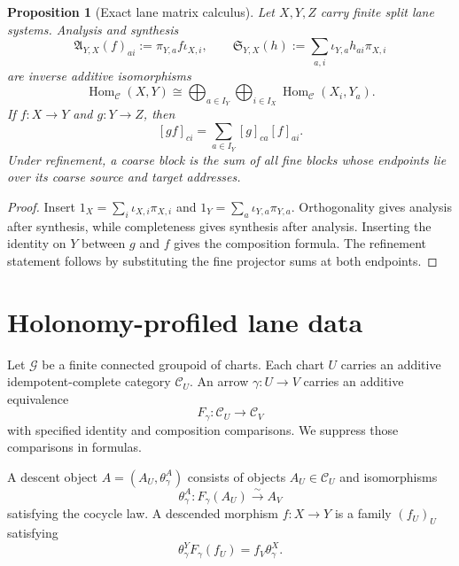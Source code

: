 \documentclass[11pt]{article}
\newtheorem{proposition}[theorem]{Proposition}
\newcommand{\HomC}{\operatorname{Hom}}
\newcommand{\Analysis}{\mathfrak A}
\newcommand{\Synthesis}{\mathfrak S}
\begin{document}
\begin{proposition}[Exact lane matrix calculus]
\label{prop:finite-matrix-calculus}
Let \(X,Y,Z\) carry finite split lane systems.  Analysis and synthesis
\[
 \Analysis_{Y,X}(f)_{ai}:=\pi_{Y,a}f\iota_{X,i},
 \qquad
 \Synthesis_{Y,X}(h):=\sum_{a,i}\iota_{Y,a}h_{ai}\pi_{X,i}
\]
are inverse additive isomorphisms
\[
 \HomC_{\mathcal C}(X,Y)
 \cong
 \bigoplus_{a\in I_Y}\bigoplus_{i\in I_X}
 \HomC_{\mathcal C}(X_i,Y_a).
\]
If \(f:X\to Y\) and \(g:Y\to Z\), then
\[
 [gf]_{ci}=\sum_{a\in I_Y}[g]_{ca}[f]_{ai}.
\]
Under refinement, a coarse block is the sum of all fine blocks whose endpoints lie over its coarse source and target addresses.
\end{proposition}

\begin{proof}
Insert \(1_X=\sum_i\iota_{X,i}\pi_{X,i}\) and
\(1_Y=\sum_a\iota_{Y,a}\pi_{Y,a}\).  Orthogonality gives analysis after synthesis, while completeness gives synthesis after analysis.  Inserting the identity on \(Y\) between \(g\) and \(f\) gives the composition formula.  The refinement statement follows by substituting the fine projector sums at both endpoints.
\end{proof}

\section{Holonomy-profiled lane data}

Let \(\mathscr G\) be a finite connected groupoid of charts.  Each chart \(U\) carries an additive idempotent-complete category \(\mathcal C_U\).  An arrow \(\gamma:U\to V\) carries an additive equivalence
\[
 F_\gamma:\mathcal C_U\longrightarrow\mathcal C_V
\]
with specified identity and composition comparisons.  We suppress those comparisons in formulas.

A descent object \(A=(A_U,\theta^A_\gamma)\) consists of objects \(A_U\in\mathcal C_U\) and isomorphisms
\[
 \theta^A_\gamma:F_\gamma(A_U)\xrightarrow{\sim}A_V
\]
satisfying the cocycle law.  A descended morphism \(f:X\to Y\) is a family \((f_U)_U\) satisfying
\[
 \theta^Y_\gamma F_\gamma(f_U)=f_V\theta^X_\gamma.
\]
\end{document}
